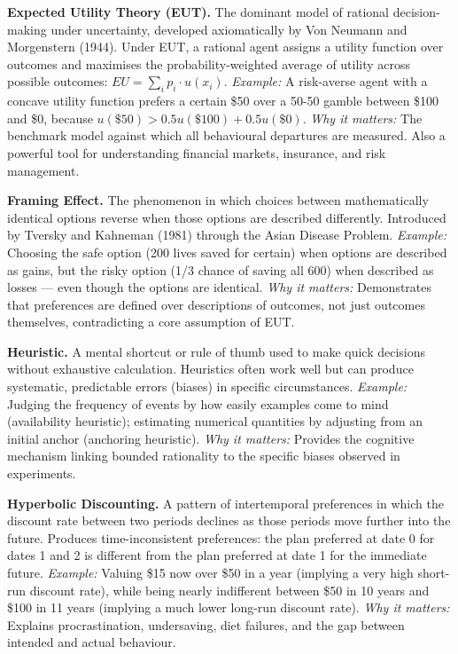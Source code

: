 \documentclass[12pt, letterpaper]{article}
\begin{document}
\textbf{Expected Utility Theory (EUT).} The dominant model of rational decision-making under uncertainty, developed axiomatically by Von Neumann and Morgenstern (1944). Under EUT, a rational agent assigns a utility function over outcomes and maximises the probability-weighted average of utility across possible outcomes: $EU = \sum_i p_i \cdot u(x_i)$. \textit{Example:} A risk-averse agent with a concave utility function prefers a certain \$50 over a 50-50 gamble between \$100 and \$0, because \(u(\$50) > 0.5u(\$100) + 0.5u(\$0)\). \textit{Why it matters:} The benchmark model against which all behavioural departures are measured. Also a powerful tool for understanding financial markets, insurance, and risk management.

\textbf{Framing Effect.} The phenomenon in which choices between mathematically identical options reverse when those options are described differently. Introduced by Tversky and Kahneman (1981) through the Asian Disease Problem. \textit{Example:} Choosing the safe option (200 lives saved for certain) when options are described as gains, but the risky option (1/3 chance of saving all 600) when described as losses --- even though the options are identical. \textit{Why it matters:} Demonstrates that preferences are defined over descriptions of outcomes, not just outcomes themselves, contradicting a core assumption of EUT.

\textbf{Heuristic.} A mental shortcut or rule of thumb used to make quick decisions without exhaustive calculation. Heuristics often work well but can produce systematic, predictable errors (biases) in specific circumstances. \textit{Example:} Judging the frequency of events by how easily examples come to mind (availability heuristic); estimating numerical quantities by adjusting from an initial anchor (anchoring heuristic). \textit{Why it matters:} Provides the cognitive mechanism linking bounded rationality to the specific biases observed in experiments.

\textbf{Hyperbolic Discounting.} A pattern of intertemporal preferences in which the discount rate between two periods declines as those periods move further into the future. Produces time-inconsistent preferences: the plan preferred at date 0 for dates 1 and 2 is different from the plan preferred at date 1 for the immediate future. \textit{Example:} Valuing \$15 now over \$50 in a year (implying a very high short-run discount rate), while being nearly indifferent between \$50 in 10 years and \$100 in 11 years (implying a much lower long-run discount rate). \textit{Why it matters:} Explains procrastination, undersaving, diet failures, and the gap between intended and actual behaviour.
\end{document}
